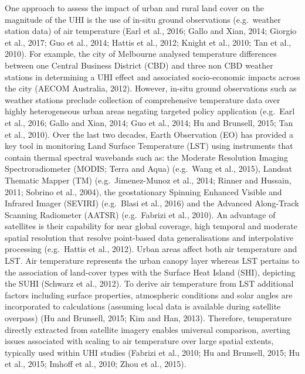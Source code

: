 \documentclass[]{book}
\begin{document}
One approach to assess the impact of urban and rural land cover on the
magnitude of the UHI is the use of in-situ ground observations
(e.g.~weather station data) of air temperature (Earl et al., 2016; Gallo
and Xian, 2014; Giorgio et al., 2017; Guo et al., 2014; Hattis et al.,
2012; Knight et al., 2010; Tan et al., 2010). For example, the city of
Melbourne analysed temperature differences between one Central Business
District (CBD) and three non CBD weather stations in determining a UHI
effect and associated socio-economic impacts across the city (AECOM
Australia, 2012). However, in-situ ground observations such as weather
stations preclude collection of comprehensive temperature data over
highly heterogeneous urban areas negating targeted policy application
(e.g.~Earl et al., 2016; Gallo and Xian, 2014; Guo et al., 2014; Hu and
Brunsell, 2015; Tan et al., 2010). Over the last two decades, Earth
Observation (EO) has provided a key tool in monitoring Land Surface
Temperature (LST) using instruments that contain thermal spectral
wavebands such as: the Moderate Resolution Imaging Spectroradiometer
(MODIS; Terra and Aqua) (e.g.~Wang et al., 2015), Landsat Thematic
Mapper (TM) (e.g.~Jimenez-Munoz et al., 2014; Rinner and Hussain, 2011;
Sobrino et al., 2004), the geostationary Spinning Enhanced Visible and
Infrared Imager (SEVIRI) (e.g.~Blasi et al., 2016) and the Advanced
Along-Track Scanning Radiometer (AATSR) (e.g.~Fabrizi et al., 2010). An
advantage of satellites is their capability for near global coverage,
high temporal and moderate spatial resolution that resolve point-based
data generalisations and interpolative processing (e.g.~Hattis et al.,
2012). Urban areas affect both air temperature and LST. Air temperature
represents the urban canopy layer whereas LST pertains to the
association of land-cover types with the Surface Heat Island (SHI),
depicting the SUHI (Schwarz et al., 2012). To derive air temperature
from LST additional factors including surface properties, atmospheric
conditions and solar angles are incorporated to calculations (assuming
local data is available during satellite overpass) (Hu and Brunsell,
2015; Kim and Han, 2013). Therefore, temperature directly extracted from
satellite imagery enables universal comparison, averting issues
associated with scaling to air temperature over large spatial extents,
typically used within UHI studies (Fabrizi et al., 2010; Hu and
Brunsell, 2015; Hu et al., 2015; Imhoff et al., 2010; Zhou et al.,
2015).
\end{document}

